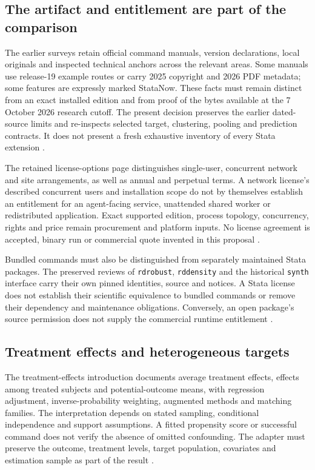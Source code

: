 \subsection{The artifact and entitlement are part of the comparison}
The earlier surveys retain official command manuals, version declarations,
local originals and inspected technical anchors across the relevant areas.
Some manuals use release-19 example routes or carry 2025 copyright and
2026 PDF metadata; some features are expressly marked StataNow. These
facts must remain distinct from an exact installed edition and from proof
of the bytes available at the 7 October 2026 research cutoff. The present
decision preserves the earlier dated-source limits and re-inspects selected
target, clustering, pooling and prediction contracts. It does not present
a fresh exhaustive inventory of every Stata extension
\cite{exec20_med_stata_multiple,exec18_gp_stata_post,exec24_stata_choice}.

The retained license-options page distinguishes single-user, concurrent
network and site arrangements, as well as annual and perpetual terms.
A network license's described concurrent users and installation scope do
not by themselves establish an entitlement for an agent-facing service,
unattended shared worker or redistributed application. Exact supported
edition, process topology, concurrency, rights and price remain procurement
and platform inputs. No license agreement is accepted, binary run or
commercial quote invented in this proposal \cite{exec13_ivrd_license,
exec24_stata_choice}.

Bundled commands must also be distinguished from separately maintained
Stata packages. The preserved reviews of \texttt{rdrobust},
\texttt{rddensity} and the historical \texttt{synth} interface carry their
own pinned identities, source and notices. A Stata license does not
establish their scientific equivalence to bundled commands or remove their
dependency and maintenance obligations. Conversely, an open package's
source permission does not supply the commercial runtime entitlement
\cite{exec13_ivrd_rdrobust,exec13_ivrd_rddensity,exec19_synth_stata_source,
exec24_stata_choice}.

\subsection{Treatment effects and heterogeneous targets}
The treatment-effects introduction documents average treatment effects,
effects among treated subjects and potential-outcome means, with regression
adjustment, inverse-probability weighting, augmented methods and matching
families. The interpretation depends on stated sampling, conditional
independence and support assumptions. A fitted propensity score or
successful command does not verify the absence of omitted confounding.
The adapter must preserve the outcome, treatment levels, target population,
covariates and estimation sample as part of the result
\cite{exec13_ci_stata_causal_intro}.

